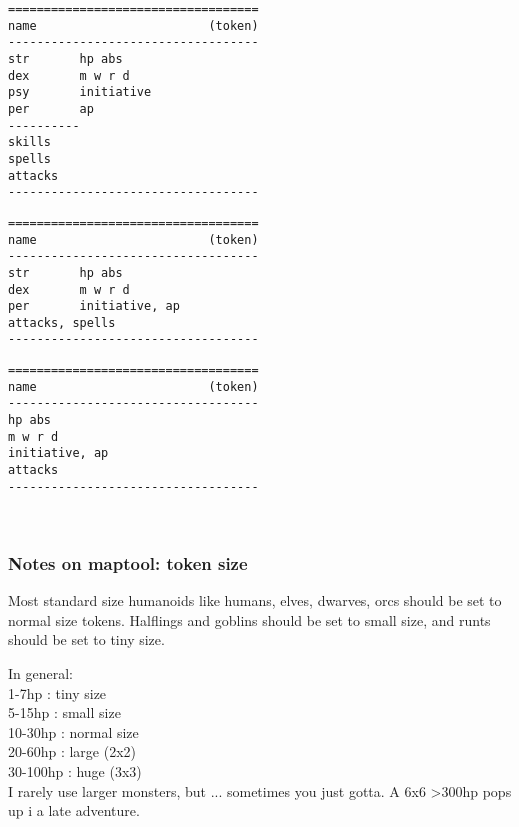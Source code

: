\noindent
\begin{center}
\begin{minipage}[t]{0.45\textwidth}                   %
\small \begin{verbatim}
===================================
name                        (token)
-----------------------------------
str       hp abs
dex       m w r d
psy       initiative
per       ap
----------
skills
spells
attacks
-----------------------------------
\end{verbatim} \normalsize
\end{minipage}
\hfill  %
\begin{minipage}[t]{0.45\textwidth}                   %
\small \begin{verbatim}
===================================
name                        (token)
-----------------------------------
str       hp abs
dex       m w r d
per       initiative, ap
attacks, spells
-----------------------------------
\end{verbatim} \normalsize

\vspace{2.0\baselineskip}

\small \begin{verbatim}
===================================
name                        (token)
-----------------------------------
hp abs
m w r d
initiative, ap
attacks
-----------------------------------
\end{verbatim} \normalsize
\end{minipage}
\end{center}

\



\subsubsection*{Notes on maptool: token size}
Most standard size humanoids like humans, elves, dwarves, orcs should be set to  normal size tokens. Halflings and goblins should be set to small size, and runts should be set to tiny size.

In general:\\
1-7hp : tiny size \\
5-15hp : small size \\
10-30hp : normal size \\
20-60hp : large (2x2) \\
30-100hp : huge (3x3) \\
I rarely use larger monsters, but ... sometimes you just gotta. A 6x6 >300hp pops up i a late adventure.

